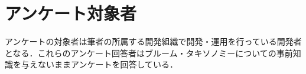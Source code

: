 \section{アンケート対象者}
アンケートの対象者は筆者の所属する開発組織で開発・運用を行っている開発者となる．これらのアンケート回答者はブルーム・タキソノミーについての事前知識を与えないままアンケートを回答している．
